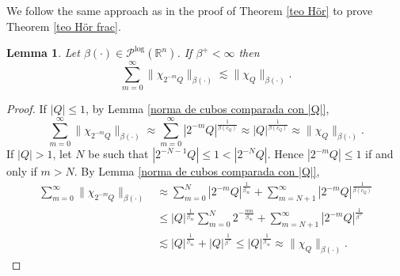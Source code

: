 \documentclass[a4paper,11pt,reqno]{amsart}
\theoremstyle{plain}
\numberwithin{equation}{section}
\newtheorem{lema}[teo]{Lemma}
\theoremstyle{definition}
\newcommand{\R}{{\mathbb{R}^n}}
\begin{document}
We follow the same approach as in the proof of Theorem \ref{teo Hör} to prove Theorem \ref{teo Hör frac}.

\begin{lema}\label{sumabilidad de beta}
	Let $\beta(\cdot)\in\mathcal{P}^{\text{log}}(\R)$. If $\beta^+<\infty$ then 	\begin{equation*}
	\sum_{m=0}^{\infty}\|\chi_{2^{-m}Q}\|_{\beta(\cdot)}\lesssim \|\chi_Q\|_{\beta(\cdot)}.
	\end{equation*}
\end{lema}
\begin{proof}
	If $|Q|\leq1$, by Lemma \ref{norma de cubos comparada con |Q|},
	\begin{equation*}
	\sum_{m=0}^{\infty}\|\chi_{2^{-m}Q}\|_{\beta(\cdot)}\approx\sum_{m=0}^{\infty}|2^{-m}Q|^\frac{1}{\beta(c_Q)}\approx|Q|^{\frac{1}{\beta(c_Q)}}\approx \|\chi_Q\|_{\beta(\cdot)}.
	\end{equation*}
	If $|Q|>1$, let $N$ be such that $|2^{-N-1}Q|\leq 1<|2^{-N}Q|$. Hence $|2^{-m}Q|\leq 1$ if and only if $m> N$. By Lemma \ref{norma de cubos comparada con |Q|},
	\begin{align*}
	\sum_{m=0}^{\infty}\|\chi_{2^{-m}Q}\|_{\beta(\cdot)}&\approx\sum_{m=0}^{N}|2^{-m}Q|^\frac{1}{\beta_\infty}+\sum_{m=N+1}^{\infty}|2^{-m}Q|^\frac{1}{\beta(c_Q)}\\
	&\leq |Q|^{\frac{1}{\beta_\infty}}\sum_{m=0}^{N}2^{-\frac{mn}{\beta_\infty}}+\sum_{m=N+1}^{\infty}|2^{-m}Q|^\frac{1}{\beta^+}\\
	&\lesssim |Q|^\frac{1}{\beta_\infty}+|Q|^{\frac{1}{\beta^+}}\leq|Q|^{\frac{1}{\beta_\infty}}\approx\|\chi_Q\|_{\beta(\cdot)}.
	\end{align*}
\end{proof}
\end{document}
